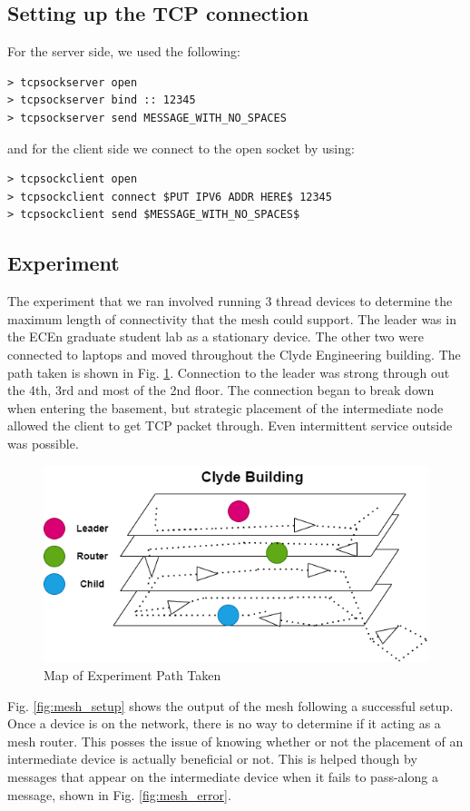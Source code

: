 \documentclass[letterpaper,twocolumn,10pt]{article}
\begin{document}
\subsection{Setting up the TCP connection}

For the server side, we used the following:
\begin{verbatim}
> tcpsockserver open
> tcpsockserver bind :: 12345
> tcpsockserver send MESSAGE_WITH_NO_SPACES
\end{verbatim}
and for the client side we connect to the open socket by using:
\begin{verbatim}
> tcpsockclient open
> tcpsockclient connect $PUT IPV6 ADDR HERE$ 12345
> tcpsockclient send $MESSAGE_WITH_NO_SPACES$
\end{verbatim}

\subsection{Experiment}

The experiment that we ran involved running 3 thread devices to determine the maximum length of connectivity that the mesh could support. The leader was in the ECEn graduate student lab as a stationary device. The other two were connected to laptops and moved throughout the Clyde Engineering building. The path taken is shown in Fig. \ref{fig:clyde}. Connection to the leader was strong through out the 4th, 3rd and most of the 2nd floor. The connection began to break down when entering the basement, but strategic placement of the intermediate node allowed the client to get TCP packet through. Even intermittent service outside was possible. 

\begin{figure}
    \centering
    \includegraphics[width=0.75\linewidth]{Figures/Clyde_Map.png}
    \caption{Map of Experiment Path Taken}
    \label{fig:clyde}
\end{figure}

Fig. \ref{fig:mesh_setup} shows the output of the mesh following a successful setup. Once a device is on the network, there is no way to determine if it acting as a mesh router. This posses the issue of knowing whether or not the placement of an intermediate device is actually beneficial or not. This is helped though by messages that appear on the intermediate device when it fails to pass-along a message, shown in Fig. \ref{fig:mesh_error}.
\end{document}
